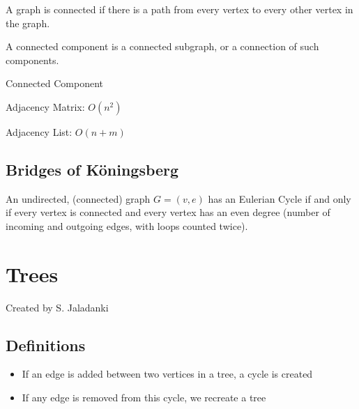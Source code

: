 \documentclass[english, 10pt]{article}
\begin{document}
    A graph is connected if there is a path from every vertex to every other vertex in the graph.

    A connected component is a connected subgraph, or a connection of such components.

\begin{algorithm}[H]

    \caption{Connected Component}
\end{algorithm}

Adjacency Matrix: $O(n^2)$

Adjacency List: $O(n+m)$

\subsection{Bridges of K{\"o}ningsberg}

\begin{thrm}
    An undirected, (connected) graph $G=(v,e)$ has an Eulerian Cycle if and only if every vertex is connected and every vertex has an even degree (number of incoming and outgoing edges, with loops counted twice).
\end{thrm}

%
%
%
%

\section{Trees}
Created by S. Jaladanki
\subsection{Definitions}


\begin{itemize}
    \item If an edge is added between two vertices in a tree, a cycle is created
    \item If any edge is removed from this cycle, we recreate a tree
\end{itemize}
\end{document}
